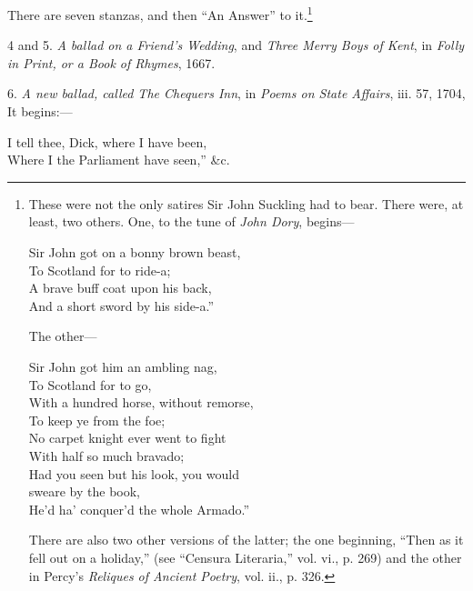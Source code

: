 There are seven stanzas, and then “An Answer” to it.\footnote{\textit{}
These were not the only satires Sir John Suckling
had to bear. There were, at least, two others. One, to
the tune of \textit{John Dory}, begins—
\settowidth{\versewidth}{Had you seen but his look, you would sweare by the book,}
\begin{fnverse}
\begin{patverse}
\vin\vin{}Sir John got on a bonny brown beast,\\
To Scotland for to ride-a;\\
A brave buff coat upon his back,\\
And a short sword by his side-a.”
\end{patverse}
\end{fnverse}
The other—
\begin{fnverse}
\begin{patverse}
\vin\vin{}Sir John got him an ambling nag,\\
To Scotland for to go,\\
With a hundred horse, without remorse,\\
To keep ye from the foe;\\
No carpet knight ever went to fight\\
With half so much bravado;\\
Had you seen but his look, you would\\ 
sweare by the book,\\
He’d ha’ conquer’d the whole Armado.”
\end{patverse}
\end{fnverse}
There are also two other versions of the latter; the one
beginning, “Then as it fell out on a holiday,” (see “Censura
Literaria,” vol. vi., p. 269) and the other in Percy's
\textit{Reliques of Ancient Poetry}, vol. ii., p. 326.}


4 and 5. \textit{A ballad on a Friend’s Wedding}, and \textit{Three Merry Boys of Kent},
in \textit{Folly in Print, or a Book of Rhymes}, 1667.

6. \textit{A new ballad, called The Chequers Inn}, in \textit{Poems on State Affairs}, iii. 57,
1704, It begins:—
\settowidth{\versewidth}{I tell thee, Dick, where I have been,}
\begin{scverse}
I tell thee, Dick, where I have been,\\
Where I the Parliament have seen,” \&c.
\end{scverse}

